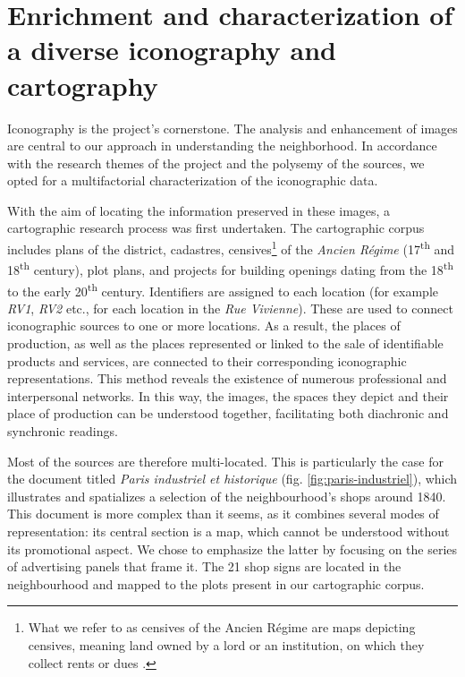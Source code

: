 \documentclass[12pt, a4paper, twocolumn]{article}
\begin{document}
\section{Enrichment and characterization of a diverse iconography and cartography}

Iconography is the project's cornerstone. The analysis and enhancement of images are central to our approach in understanding the neighborhood. In accordance with the research themes of the project and the polysemy of the sources, we opted for a multifactorial characterization of the iconographic data.

With the aim of locating the information preserved in these images, a cartographic research process was first undertaken. The cartographic corpus includes plans of the district, cadastres, censives\footnote{
    What we refer to as censives of the Ancien Régime are maps depicting censives, meaning land owned by a lord or an institution, on which they collect rents or dues \parencite{braultCartographieCensivesParisiennes2008}.
} of the \textit{Ancien Régime} (17\textsuperscript{th} and 18\textsuperscript{th} century), plot plans, and projects  for building openings dating from the 18\textsuperscript{th} to the early 20\textsuperscript{th} century. Identifiers are assigned to each location (for example \textit{RV1}, \textit{RV2} etc., for each location in the \textit{Rue Vivienne}). These are used to connect iconographic sources to one or more locations. As a result, the places of production, as well as the places represented or linked to the sale of identifiable products and services, are connected to their corresponding iconographic representations. This method reveals the existence of numerous professional and interpersonal networks. In this way, the images, the spaces they depict and their place of production can be understood together, facilitating both diachronic and synchronic readings.

Most of the sources are therefore multi-located. This is particularly the case for the document titled \textit{Paris industriel et historique} (fig. \ref{fig:paris-industriel}), which illustrates and spatializes a selection of the neighbourhood's shops  around 1840. This document is more complex than it seems, as it combines several modes of representation: its central section is a map, which cannot be understood without its promotional aspect. We chose to emphasize the latter by focusing on  the series of advertising panels that frame it. The 21 shop signs are located in the neighbourhood and mapped to the plots present in our cartographic corpus.
\end{document}
